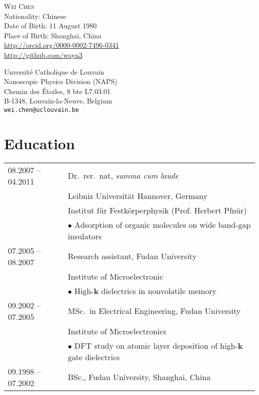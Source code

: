 \documentclass[a4paper, 11pt, DIV=15,headings=normal]{scrartcl}
\begin{document}
\begin{minipage}{0.55\linewidth}
{\Large \textsc{Wei Chen}}\\
Nationality: Chinese \\
Date of Birth: 11 August 1980 \\
Place of Birth: Shanghai, China \\
\small \url{http://orcid.org/0000-0002-7496-0341} \\
\small \url{http://github.com/wayn3}
\end{minipage}\hfill
\begin{minipage}{0.40\linewidth}
Unversit\'{e} Catholique de Louvain\\
Nanoscopic Physics Division (NAPS)\\
Chemin des \'{E}toiles, 8 bte L7.03.01 \\
B-1348, Louvain-la-Neuve, Belgium \\
\texttt{wei.chen@uclouvain.be}
\end{minipage}
\vspace{6mm}

\section*{Education}
\begin{tabular}{ll}
08.2007 -- 04.2011 & Dr.\ rer.\ nat, \emph{summa cum laude}  \\
                   & Leibniz Universit\"{a}t Hannover, Germany\\
                   & Institut f\"{u}r Festk\"{o}rperphysik (Prof. Herbert Pfn\"{u}r) \\
                   & $\bullet$ Adsorption of organic molecules on wide band-gap insulators \\
07.2005 -- 08.2007 & Research assistant, Fudan University\\
                   & Institute of Microelectronic \\
                   & $\bullet$ High-$\mathbf{k}$ dielectrics in nonvolatile memory \\
09.2002 -- 07.2005 & MSc.\ in Electrical Engineering, Fudan University \\
                   & Institute of Microelectronics  \\
                   & $\bullet$ DFT study on atomic layer deposition of high-$\mathbf{k}$ gate dielectrics\\
09.1998 -- 07.2002 & BSc., Fudan University, Shanghai, China
\end{tabular}
\end{document}
